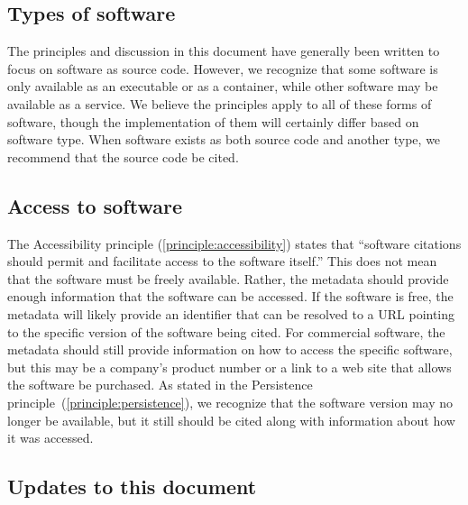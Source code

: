 \documentclass[11pt, oneside]{amsart}
\newcommand{\katznote}[1]{ {\textcolor{blue} { ***DSK: #1 }}} %
\newcommand{\LJHnote}[1]{ {\textcolor{fuschsia} { ***LJH: #1 }}} %
\begin{document}
\subsection{Types of software}

The principles and discussion in this document have generally been written to focus on software
as source code.  However, we recognize that some software is only available as an executable or as a container, while other software may be available as a service.  We believe the principles apply to all of these forms of software, though the implementation of them will certainly differ based on software type.  When software exists as both source code and another type, we recommend that the source code be cited.


\subsection{Access to software}
\label{sec:access}

The Accessibility principle (\ref{principle:accessibility}) states that ``software citations should permit and facilitate access to the software itself.''
This does not mean that the software must be freely available.
Rather, the metadata should provide enough information that the software can be accessed.
If the software is free, the metadata will likely provide an identifier that can be resolved to a URL pointing to the specific version of the software being cited.
For commercial software, the metadata should still provide information on how to access the specific software, but this may be a company's product number or a link to a web site that allows the software be purchased.
As stated in the Persistence principle~(\ref{principle:persistence}), we recognize that the software version may no longer be available, but it still should be cited along with information about how it was accessed.



%

\subsection{Updates to this document}
\end{document}
